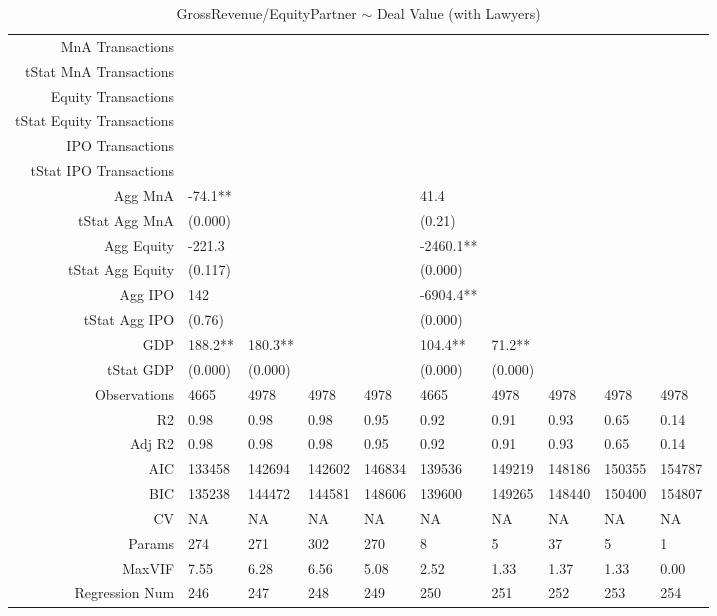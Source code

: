 \begin{table}[ht]
\begin{tabular}{rlllllllll}
  MnA Transactions &  &  &  &  &  &  &  &  &  \\ 
  tStat MnA Transactions &  &  &  &  &  &  &  &  &  \\ 
  Equity Transactions &  &  &  &  &  &  &  &  &  \\ 
  tStat Equity Transactions &  &  &  &  &  &  &  &  &  \\ 
  IPO Transactions &  &  &  &  &  &  &  &  &  \\ 
  tStat IPO Transactions &  &  &  &  &  &  &  &  &  \\ 
  Agg MnA & -74.1** &  &  &  & 41.4 &  &  &  &  \\ 
  tStat Agg MnA & (0.000) &  &  &  & (0.21) &  &  &  &  \\ 
  Agg Equity & -221.3 &  &  &  & -2460.1** &  &  &  &  \\ 
  tStat Agg Equity & (0.117) &  &  &  & (0.000) &  &  &  &  \\ 
  Agg IPO & 142 &  &  &  & -6904.4** &  &  &  &  \\ 
  tStat Agg IPO & (0.76) &  &  &  & (0.000) &  &  &  &  \\ 
  GDP & 188.2** & 180.3** &  &  & 104.4** & 71.2** &  &  &  \\ 
  tStat GDP & (0.000) & (0.000) &  &  & (0.000) & (0.000) &  &  &  \\ 
  Observations & 4665 & 4978 & 4978 & 4978 & 4665 & 4978 & 4978 & 4978 & 4978 \\ 
  R2 & 0.98 & 0.98 & 0.98 & 0.95 & 0.92 & 0.91 & 0.93 & 0.65 & 0.14 \\ 
  Adj R2 & 0.98 & 0.98 & 0.98 & 0.95 & 0.92 & 0.91 & 0.93 & 0.65 & 0.14 \\ 
  AIC & 133458 & 142694 & 142602 & 146834 & 139536 & 149219 & 148186 & 150355 & 154787 \\ 
  BIC & 135238 & 144472 & 144581 & 148606 & 139600 & 149265 & 148440 & 150400 & 154807 \\ 
  CV & NA & NA & NA & NA & NA & NA & NA & NA & NA \\ 
  Params & 274 & 271 & 302 & 270 & 8 & 5 & 37 & 5 & 1 \\ 
  MaxVIF & 7.55 & 6.28 & 6.56 & 5.08 & 2.52 & 1.33 & 1.37 & 1.33 & 0.00 \\ 
  Regression Num & 246 & 247 & 248 & 249 & 250 & 251 & 252 & 253 & 254 \\ 
   \hline
\end{tabular}
\caption{GrossRevenue/EquityPartner $\sim$ Deal Value (with Lawyers)} 
\end{table}
